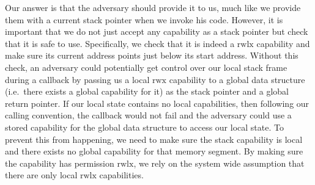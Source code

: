 \documentclass[compsoc,conference,letterpaper,fleqn]{IEEEtran}
\newcommand{\plainperm}[1]{\mathrm{#1}}
\newcommand{\rwx}{\plainperm{rwx}}
\newcommand{\rwlx}{\plainperm{rwlx}}
\begin{document}
Our answer is that the adversary should provide it to us, much like we provide
them with a current stack pointer when we invoke his code.  However, it is
important that we do not just accept any capability as a stack pointer but check
that it is safe to use.  Specifically, we check that it is indeed a $\rwlx$
capability and make sure its current address points just below its start address.
Without this check, an adversary could potentially get control over
our local stack frame during a callback by passing us a local $\rwx$
capability to a global data structure (i.e.\ there exists a global
capability for it) as the stack pointer and a global
return pointer. If our local state contains no local capabilities,
then following our calling convention, the callback would not fail and
the adversary could use a stored capability for the global data
structure to access our local state. 
To prevent this from happening, we need to make sure the stack
capability is local and there exists no global capability for that
memory segment. By making sure the capability has permission $\rwlx$,
we rely on the system wide assumption that there are only local
$\rwlx$ capabilities.
\end{document}
